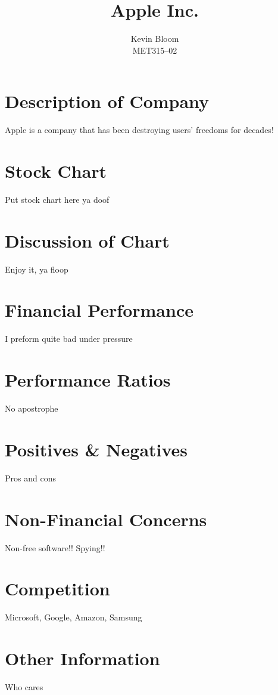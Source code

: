 \documentclass[12pt,a4paper,titlepage]{article}
\begin{document}
\title{Apple Inc.}
\author{Kevin Bloom \\ MET315--02}
\maketitle

\newpage

\tableofcontents

\newpage

\section{Description of Company}
Apple is a company that has been destroying users' freedoms for decades!

\section{Stock Chart}
Put stock chart here ya doof

\section{Discussion of Chart}
Enjoy it, ya floop

\section{Financial Performance}
I preform quite bad under pressure

\section{Performance Ratios}
No apostrophe

\section{Positives \& Negatives}
Pros and cons

\section{Non-Financial Concerns}
Non-free software!! Spying!!

\section{Competition}
Microsoft, Google, Amazon, Samsung

\section{Other Information}
Who cares
\end{document}
